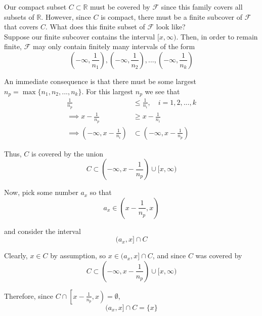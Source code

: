 \documentclass[12pt]{article}
\newlength\tindent
\renewcommand{\indent}{\hspace*{\tindent}}
\newcommand{\R}{\mathbb R}
\begin{document}
\indent Our compact subset $C \subset \R$ must be covered by $\mathcal F$ since this family covers all subsets of $\R$. However, since $C$ is compact, there must be a finite subcover of $\mathcal F$ that covers $C$. What does this finite subset of $\mathcal F$ look like? \\

\indent Suppose our finite subcover contains the interval $[x,\infty)$. Then, in order to remain finite, $\mathcal F$ may only contain finitely many intervals of the form
\begin{equation*}
	\left(-\infty, \frac{1}{n_1} \right), \left(-\infty, \frac{1}{n_2} \right),... , \left(-\infty, \frac{1}{n_k} \right)
\end{equation*}

\indent An immediate consequence is that there must be some largest $n_p = \max \{n_1, n_2, ..., n_k\}$. For this largest $n_p$ we see that
\begin{align*}
	\frac{1}{n_p} &\leq \frac{1}{n_i}, \quad i = 1, 2, ..., k \\
	\implies x - \frac{1}{n_p} &\geq x - \frac{1}{n_i} \\
	\implies \left(-\infty, x - \frac{1}{n_i} \right) &\subset \left(-\infty, x - \frac{1}{n_p} \right)
\end{align*}

Thus, $C$ is covered by the union 
\begin{equation*}
	C \subset \left(-\infty, x - \frac{1}{n_p} \right) \cup [x, \infty)
\end{equation*}

Now, pick some number $a_x$ so that
\begin{equation*}
	a_x \in \left( x - \frac{1}{n_p}, x \right)
\end{equation*}

and consider the interval
\begin{equation*}
	(a_x, x] \cap C
\end{equation*}

Clearly, $x \in C$ by assumption, so $x \in (a_x, x] \cap C$, and since $C$ was covered by
\begin{equation*}
	C \subset \left(-\infty, x - \frac{1}{n_p} \right) \cup [x,\infty)
\end{equation*}

Therefore, since $C \cap \left[x - \frac{1}{n_p}, x\right) = \emptyset$,
\begin{equation*}
	(a_x, x] \cap C = \{x\}
\end{equation*}
\end{document}
